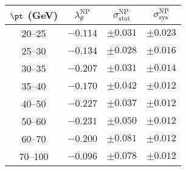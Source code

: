 \begin{tabular}{c||c||c|c}
$\pt$ (GeV) & $\lambda_\theta^{\text{NP}}$ & $\sigma_{\text{stat}}^{\text{NP}}$ & $\sigma_{\text{sys}}^{\text{NP}}$  \\
\hline
20--25 & $-0.114$ & $\pm0.031$ & $\pm0.023$\\
25--30 & $-0.134$ & $\pm0.028$ & $\pm0.016$\\
30--35 & $-0.207$ & $\pm0.031$ & $\pm0.014$\\
35--40 & $-0.170$ & $\pm0.042$ & $\pm0.012$\\
40--50 & $-0.227$ & $\pm0.037$ & $\pm0.012$\\
50--60 & $-0.231$ & $\pm0.050$ & $\pm0.012$\\
60--70 & $-0.200$ & $\pm0.081$ & $\pm0.012$\\
70--100 & $-0.096$ & $\pm0.078$ & $\pm0.012$
\end{tabular}
